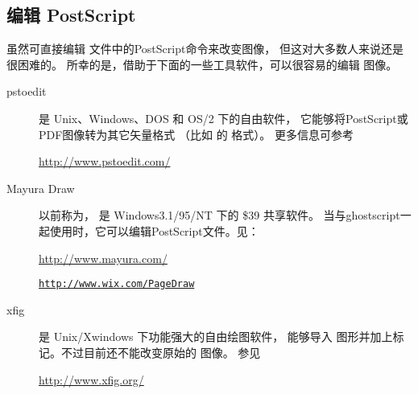 \subsection{编辑 PostScript}\label{ssec:editps}

虽然可直接编辑  文件中的PostScript命令来改变图像，
但这对大多数人来说还是很困难的。
所幸的是，借助于下面的一些工具软件，可以很容易的编辑  图像。

\begin{description}
	\item[pstoedit]
	
	 是 Unix、Windows、DOS 和 OS/2 下的自由软件，
	它能够将PostScript或PDF图像转为其它矢量格式
	（比如 的 格式）。
	更多信息可参考
	\begin{center}
		\url{http://www.pstoedit.com/}
	\end{center}

	\item[Mayura Draw]
	
	 以前称为，
	是 Windows3.1/95/NT 下的 \$39 共享软件。
	当与ghostscript一起使用时，它可以编辑PostScript文件。见：
	\begin{center}
		\url{http://www.mayura.com/}
	\end{center}
	\href{http://www.wix.com/PageDraw}{\texttt{http://www.wix.com/PageDraw}}
	
	\item[xfig]
	
	 是 Unix/Xwindows 下功能强大的自由绘图软件，
	能够导入  图形并加上标记。不过目前还不能改变原始的 图像。
	参见
	\begin{center}
		\url{http://www.xfig.org/}
	\end{center}
	
\end{description}

\clearpage
\endinput
